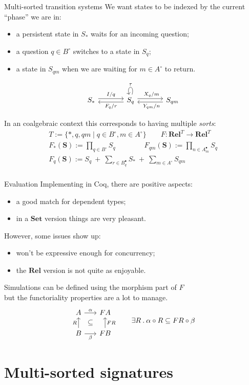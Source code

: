 \documentclass[mathserif]{beamer}
\newcommand{\que}{\circ}
\newcommand{\ans}{\bullet}
\begin{document}
\begin{frame}[fragile]{Multi-sorted transition systems}
  We want states to be indexed by the current ``phase'' we are in:
  \begin{itemize}
    \item a persistent state in $S_*$ waits for an incoming question;
    \item a question $q \in B^\que$ switches to a state in $S_q$;
    \item a state in $S_{qm}$ when we are waiting for $m \in A^\que$ to return.
  \end{itemize}
  \[
    \begin{tikzcd}[column sep=large]
      S_* \ar[r, "I/q", shift left] &
      S_q \ar[r, "X_q/m", shift left, pos=0.55]
          \ar[l, "F_q/r", shift left]
          \ar[loop above, "\tau", <-] &
      S_{qm} \ar[l, "Y_{qm}/n", shift left, pos=0.45]
    \end{tikzcd}
  \]

  \pause
  \vfill
  In an coalgebraic context this corresponds to having multiple \emph{sorts}:
  \begin{gather*}
    T := \{ *, q, qm \mid q \in B^\que, m \in A^\que \} \qquad
    F : \mathbf{Rel}^T \rightarrow \mathbf{Rel}^T \\[1ex]
    F_*(\mathbf{S}) := \prod_{q \in B^\que} S_q \qquad \qquad
    F_{qm}(\mathbf{S}) := \prod_{n \in A^\ans_m} S_q \\
    F_q(\mathbf{S}) := S_q \:+\: \sum_{r \in B^\ans_q} S_* \:+\: \sum_{m \in A^\que} S_{qm} \\
  \end{gather*}
  \vspace{-2em}
\end{frame}

\begin{frame}[fragile]{Evaluation}
  Implementing in Coq,
  there are positive aspects:
  \begin{itemize}
    \item a good match for dependent types;
    \item in a $\mathbf{Set}$ version things are very pleasant.
  \end{itemize}
  However, some issues show up:
  \begin{itemize}
    \item won't be expressive enough for concurrency;
    \item the $\mathbf{Rel}$ version is not quite as enjoyable.
  \end{itemize}

  \pause
  \vfill
  Simulations can be defined using the morphism part of $F$ \\
  but the functoriality properties are a lot to manage.
  \[
    \begin{tikzcd}[sep=0]
      A \ar[rr, "\alpha"] &&
      F A \\
      & \subseteq & \\
      B \ar[rr, "\beta"'] \ar[uu, "R"] &&
      F B \ar[uu, "F R"']
    \end{tikzcd}
    \qquad
    \exists R \mathbin.
    \alpha \circ R  \subseteq  F R \circ \beta
  \]
\end{frame}

\section{Multi-sorted signatures}

\frame\sectionpage
\end{document}
